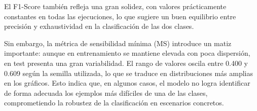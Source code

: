 \vspace{1em}

El F1-Score también refleja una gran solidez, con valores prácticamente constantes en todas las ejecuciones, lo que sugiere un buen equilibrio entre precisión y exhaustividad en la clasificación de las dos clases.

\vspace{1em}

Sin embargo, la métrica de sensibilidad mínima (MS) introduce un matiz importante: aunque en entrenamiento se mantiene elevada con poca dispersión, en test presenta una gran variabilidad. El rango de valores oscila entre 0.400 y 0.609 según la semilla utilizada, lo que se traduce en distribuciones más amplias en los gráficos. Esto indica que, en algunos casos, el modelo no logra identificar de forma adecuada los ejemplos más difíciles de una de las clases, comprometiendo la robustez de la clasificación en escenarios concretos.

